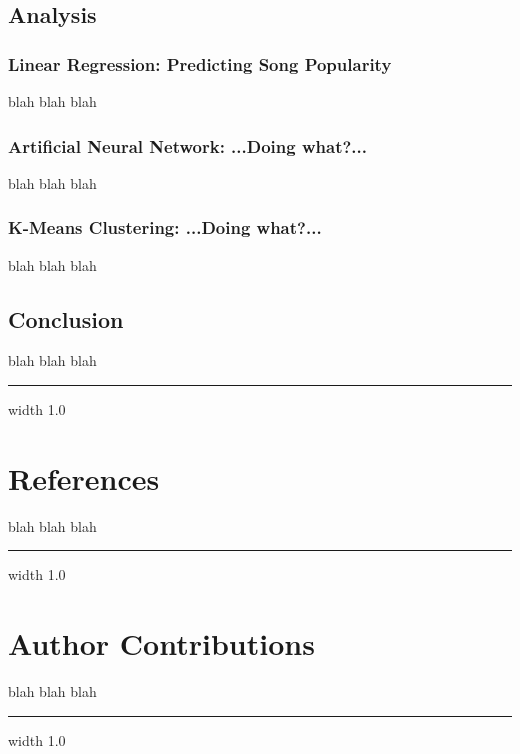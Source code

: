 \documentclass[11pt]{article}
\newcommand{\horizontalLine}{
	\begin{center}
		\hrule width 1.0\textwidth
	\end{center}
}
\begin{document}
\subsection{Analysis}
\label{subsec:analysis}

\subsubsection{Linear Regression: Predicting Song Popularity}
\label{subsubsec:linearRegression}
blah blah blah

\subsubsection{Artificial Neural Network: ...Doing what?...}
\label{subsubsec:ann}
blah blah blah

\subsubsection{K-Means Clustering: ...Doing what?...}
\label{subsubsec:kMeans}
blah blah blah

\subsection{Conclusion}
\label{subsec:conclusion}
blah blah blah

\horizontalLine
\section{References}
\label{sec:references}
blah blah blah

\horizontalLine
\section{Author Contributions}
\label{sec:authorContributions}
blah blah blah

\horizontalLine
\appendix
\end{document}
